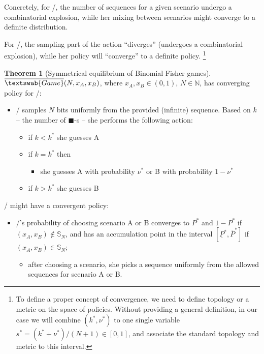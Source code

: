 \documentclass{article}
\newcommand{\bb}{\blacksquare}
\theoremstyle{definition}
\newtheorem{theorem}{Theorem}[section]
\newcommand{\InfG}[1]{$\overline{\textswab{Game}}(#1)$}
\begin{document}
Concretely, for \PII/, the number of sequences for a given scenario undergo a combinatorial explosion, while her mixing between scenarios might converge to a definite distribution.

For \PI/, the sampling part of the action ``diverges'' (undergoes a combinatorial explosion), while her policy will ``converge'' to a definite policy. \footnote{To define a proper concept of convergence, we need to define topology or a metric on the space of policies. Without providing a general definition, in our case we will combine $(k^*,\nu^*)$ to one single variable $s^* = (k^* + \nu^*)/(N+1) \in [0,1]$, and associate the standard topology and metric to this interval.}


\begin{theorem}[Symmetrical equilibrium of Binomial Fisher games]
\label{thm:BinomialSymmetric}
\InfG{N,x_A,x_B}, where $x_A, x_B \in (0,1)$, $N \in \mathbb{N}$, has converging policy for \PI/:

\begin{itemize}
    \item \PI/ samples $N$ bits uniformly from the provided (infinite) sequence. Based on $k$ -- the number of $\bb$-s -- she performs the following action:
    \begin{itemize}
        \item if $k<k^*$ she guesses A
        \item if $k=k^*$ then 
        \begin{itemize}
            \item she guesses A with probability $\nu^*$ or B with probability $1-\nu^*$
        \end{itemize} 
        \item if $k>k^*$ she guesses B
    \end{itemize}
\end{itemize}

\PII/ might have a convergent policy:

\begin{itemize}
    \item \PII/'s probability of choosing scenario A or B converges to $P^*$ and $1-P^*$ if $(x_A,x_B) \notin \mathbb{S}_N$, and has an accumulation point in the interval $[\underline{P}^*,\overline{P}^*]$ if $(x_A,x_B) \in \mathbb{S}_N$;
    \begin{itemize}
        \item after choosing a scenario, she picks a sequence uniformly from the allowed sequences for scenario A or B.
    \end{itemize}
\end{itemize}


\end{theorem}
\end{document}
